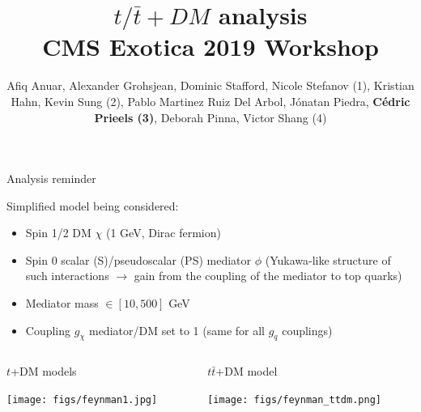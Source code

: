 \documentclass[9pt]{beamer}
\title{$t/\bar t+DM$ analysis \\ CMS Exotica 2019 Workshop}
\date{}
\author{\justifying Afiq Anuar, Alexander Grohsjean, Dominic Stafford, Nicole Stefanov (1), Kristian Hahn, Kevin Sung (2), Pablo Martinez Ruiz Del Arbol, J\'{o}natan Piedra,  \textbf{C\'{e}dric Prieels (3)}, Deborah Pinna, Victor Shang (4)}
\institute{\textbf{\textbf{November 2, 2019}} \\ 
\begin{multicols}{2}
(1) DESY \\
(2) NorthWestern University \\
(3) Instituto de Fisica de Cantabria \\
(4) University of Wisconsin
\end{multicols}}
\begin{document}
\maketitle

\begin{frame}{Analysis reminder}
\justifying

Simplified model being considered:

\begin{itemize} 
	\justifying
	\item Spin 1/2 DM $\chi$ (1 GeV, Dirac fermion) \\
	\item Spin 0 scalar (S)/pseudoscalar (PS) mediator $\phi$ (Yukawa-like structure of such interactions $\rightarrow$ gain from the coupling of the mediator to top quarks) \\
	\item Mediator mass $\in [10, 500]$ GeV \\
	\item Coupling $g_{\chi}$ mediator/DM set to 1 (same for all $g_q$ couplings) \\
\end{itemize}\vfill

\begin{columns}
	\begin{column}{0.49\textwidth}
		\begin{center}
			\begin{block}{ \centering $t$+DM models}\end{block}	
			\texttt{[image: figs/feynman1.jpg]}
    		 \end{center}
	\end{column} \hfill
	\begin{column}{0.49\textwidth}
		\begin{center}
			\begin{block}{\centering $t \bar t$+DM model}\end{block}				
			\texttt{[image: figs/feynman\_ttdm.png]}
    		 \end{center}
	\end{column} \hfill
\end{columns} \vfill


\end{frame}
\end{document}
